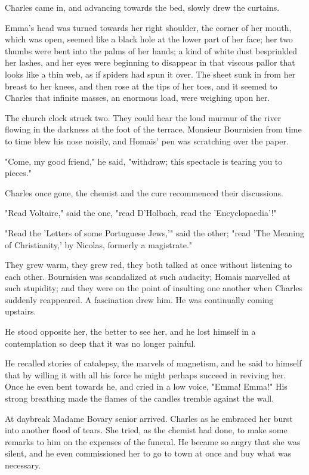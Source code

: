 \documentclass{tufte-book}
\begin{document}
Charles came in, and advancing towards the bed, slowly drew the
curtains.

Emma's head was turned towards her right shoulder, the corner of her
mouth, which was open, seemed like a black hole at the lower part of her
face; her two thumbs were bent into the palms of her hands; a kind
of white dust besprinkled her lashes, and her eyes were beginning to
disappear in that viscous pallor that looks like a thin web, as if
spiders had spun it over. The sheet sunk in from her breast to her
knees, and then rose at the tips of her toes, and it seemed to Charles
that infinite masses, an enormous load, were weighing upon her.

The church clock struck two. They could hear the loud murmur of the
river flowing in the darkness at the foot of the terrace. Monsieur
Bournisien from time to time blew his nose noisily, and Homais' pen was
scratching over the paper.

"Come, my good friend," he said, "withdraw; this spectacle is tearing
you to pieces."

Charles once gone, the chemist and the cure recommenced their
discussions.

"Read Voltaire," said the one, "read D'Holbach, read the
'Encyclopaedia'!"

"Read the 'Letters of some Portuguese Jews,'" said the other; "read 'The
Meaning of Christianity,' by Nicolas, formerly a magistrate."

They grew warm, they grew red, they both talked at once without
listening to each other. Bournisien was scandalized at such audacity;
Homais marvelled at such stupidity; and they were on the point of
insulting one another when Charles suddenly reappeared. A fascination
drew him. He was continually coming upstairs.

He stood opposite her, the better to see her, and he lost himself in a
contemplation so deep that it was no longer painful.

He recalled stories of catalepsy, the marvels of magnetism, and he
said to himself that by willing it with all his force he might perhaps
succeed in reviving her. Once he even bent towards he, and cried in a
low voice, "Emma! Emma!" His strong breathing made the flames of the
candles tremble against the wall.

At daybreak Madame Bovary senior arrived. Charles as he embraced her
burst into another flood of tears. She tried, as the chemist had done,
to make some remarks to him on the expenses of the funeral. He became so
angry that she was silent, and he even commissioned her to go to town at
once and buy what was necessary.
\end{document}
